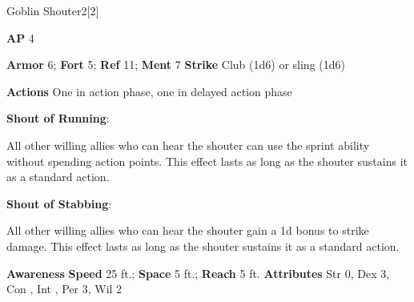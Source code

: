 \begin{monsection}{Goblin Shouter}{2}[2]
\vspace{-1em}\vspace{-1em}
\begin{spellcontent}
\begin{spelltargetinginfo}
{\textbf{AP} 4}

\pari \textbf{Armor} 6;
\textbf{Fort} 5;
\textbf{Ref} 11;
\textbf{Ment} 7
\pari \textbf{Strike} Club  (1d6) or sling  (1d6)


\pari \textbf{Actions} One in action phase, one in delayed action phase
\end{spelltargetinginfo}


\begin{spelleffects}

\pari
\textbf{Shout of Running}:

All other willing allies who can hear the shouter can use the sprint ability without spending action points.
This effect lasts as long as the shouter sustains it as a standard action.




\vspace{0.5em}
\pari
\textbf{Shout of Stabbing}:

All other willing allies who can hear the shouter gain a \plus1d bonus to strike damage.
This effect lasts as long as the shouter sustains it as a standard action.




\end{spelleffects}

\end{spellcontent}

\begin{monsterfooter}
\pari \textbf{Awareness} 
\pari \textbf{Speed} 25 ft.;
\textbf{Space} 5 ft.;
\textbf{Reach} 5 ft.
\pari \textbf{Attributes}
Str 0,
Dex 3,
Con ,
Int ,
Per 3,
Wil 2
\end{monsterfooter}
\end{monsection}



